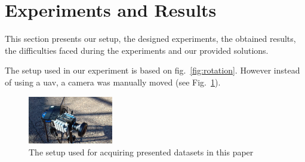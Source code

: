 \graphicspath{{./content/experiments/figures/}}

\section{Experiments and Results}
\label{sec:exp-res}
This section presents our setup, the designed experiments, the obtained
results, the difficulties faced during the experiments and our provided
solutions.


The setup used in our experiment is based on fig.~\ref{fig:rotation}.
However instead of using a \gls{uav}, a camera was manually moved (see
Fig.~\ref{fig:setup}).

\begin{figure}
  \centering
\includegraphics[width=0.33\textwidth]{./content/experiments/figures/setup.jpg}
\caption{The setup used for acquiring presented datasets in this paper}
\label{fig:setup}
\end{figure}

